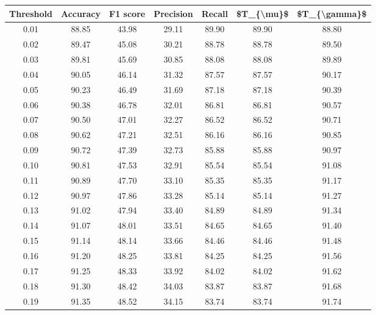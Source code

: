 \begin{tabular}{|c|c|c|c|c|c|c|}
\hline
 Threshold &  Accuracy &  F1 score &  Precision &  Recall &  \$T\_\{\textbackslash mu\}\$ &  \$T\_\{\textbackslash gamma\}\$ \\
\hline
      0.01 &     88.85 &     43.98 &      29.11 &   89.90 &      89.90 &         88.80 \\
      0.02 &     89.47 &     45.08 &      30.21 &   88.78 &      88.78 &         89.50 \\
      0.03 &     89.81 &     45.69 &      30.85 &   88.08 &      88.08 &         89.89 \\
      0.04 &     90.05 &     46.14 &      31.32 &   87.57 &      87.57 &         90.17 \\
      0.05 &     90.23 &     46.49 &      31.69 &   87.18 &      87.18 &         90.39 \\
      0.06 &     90.38 &     46.78 &      32.01 &   86.81 &      86.81 &         90.57 \\
      0.07 &     90.50 &     47.01 &      32.27 &   86.52 &      86.52 &         90.71 \\
      0.08 &     90.62 &     47.21 &      32.51 &   86.16 &      86.16 &         90.85 \\
      0.09 &     90.72 &     47.39 &      32.73 &   85.88 &      85.88 &         90.97 \\
      0.10 &     90.81 &     47.53 &      32.91 &   85.54 &      85.54 &         91.08 \\
      0.11 &     90.89 &     47.70 &      33.10 &   85.35 &      85.35 &         91.17 \\
      0.12 &     90.97 &     47.86 &      33.28 &   85.14 &      85.14 &         91.27 \\
      0.13 &     91.02 &     47.94 &      33.40 &   84.89 &      84.89 &         91.34 \\
      0.14 &     91.07 &     48.01 &      33.51 &   84.65 &      84.65 &         91.40 \\
      0.15 &     91.14 &     48.14 &      33.66 &   84.46 &      84.46 &         91.48 \\
      0.16 &     91.20 &     48.25 &      33.81 &   84.25 &      84.25 &         91.56 \\
      0.17 &     91.25 &     48.33 &      33.92 &   84.02 &      84.02 &         91.62 \\
      0.18 &     91.30 &     48.42 &      34.03 &   83.87 &      83.87 &         91.68 \\
      0.19 &     91.35 &     48.52 &      34.15 &   83.74 &      83.74 &         91.74 \\

\end{tabular}
